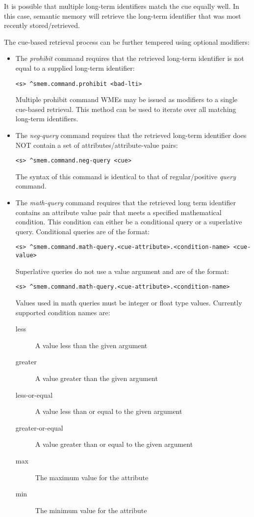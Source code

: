 It is possible that multiple long-term identifiers match the cue equally well. 
In this case, semantic memory will retrieve the long-term identifier that was most recently stored/retrieved.

The cue-based retrieval process can be further tempered using optional modifiers:

\begin{itemize}

\item 
The \emph{prohibit} command requires that the retrieved long-term identifier is not equal to a supplied long-term identifier:
\begin{verbatim}
<s> ^smem.command.prohibit <bad-lti>
\end{verbatim}
Multiple prohibit command WMEs may be issued as modifiers to a single cue-based retrieval.  
This method can be used to iterate over all matching long-term identifiers.

\item 
The \emph{neg-query} command requires that the retrieved long-term identifier does NOT contain a set of attributes/attribute-value pairs:
\begin{verbatim}
<s> ^smem.command.neg-query <cue>
\end{verbatim}
The syntax of this command is identical to that of regular/positive \emph{query} command.

\item
The \emph{math-query} command requires that the retrieved long term identifier contains an attribute value pair that meets a specified mathematical condition. 
This condition can either be a conditional query or a superlative query. 
Conditional queries are of the format:
\begin{verbatim}
<s> ^smem.command.math-query.<cue-attribute>.<condition-name> <cue-value>
\end{verbatim}
Superlative queries do not use a value argument and are of the format:
\begin{verbatim}
<s> ^smem.command.math-query.<cue-attribute>.<condition-name>
\end{verbatim}
Values used in math queries must be integer or float type values.
Currently supported condition names are:
\begin{description}
  \item[less] A value less than the given argument
  \item[greater] A value greater than the given argument
  \item[less-or-equal] A value less than or equal to the given argument
  \item[greater-or-equal] A value greater than or equal to the given argument
  \item[max] The maximum value for the attribute
  \item[min] The minimum value for the attribute
\end{description}
\end{itemize}

